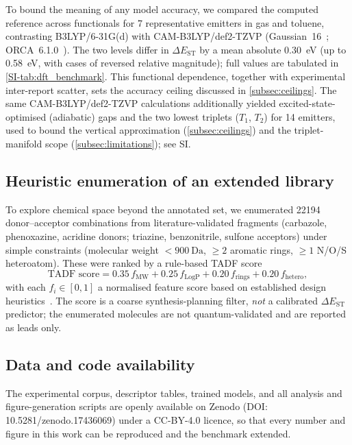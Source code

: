 To bound the meaning of any model accuracy, we compared the computed reference
across functionals for \num{7} representative emitters in gas and toluene,
contrasting B3LYP/6-31G(d) with CAM-B3LYP/def2-TZVP (Gaussian~16~\cite{Gaussian16};
ORCA~6.1.0~\cite{Neese2020}). The two levels differ in $\Delta E_\text{ST}$ by a
mean absolute \qty{0.30}{\electronvolt} (up to \qty{0.58}{\electronvolt}, with
cases of reversed relative magnitude); full values are tabulated in
\cref{SI-tab:dft_benchmark}. This functional dependence, together with
experimental inter-report scatter, sets the accuracy ceiling discussed in
\cref{subsec:ceilings}. The same CAM-B3LYP/def2-TZVP calculations additionally
yielded excited-state-optimised (adiabatic) gaps and the two lowest triplets
($T_1$, $T_2$) for \num{14} emitters, used to bound the vertical approximation
(\cref{subsec:ceilings}) and the triplet-manifold scope (\cref{subsec:limitations});
see SI.

\subsection{Heuristic enumeration of an extended library}\label{sec:library_expansion}

To explore chemical space beyond the annotated set, we enumerated \num{22194}
donor--acceptor combinations from literature-validated fragments (carbazole,
phenoxazine, acridine donors; triazine, benzonitrile, sulfone acceptors) under
simple constraints (molecular weight $<\qty{900}{\dalton}$, $\geq 2$ aromatic
rings, $\geq 1$ N/O/S heteroatom). These were ranked by a rule-based TADF score
\begin{equation}
  \text{TADF score} = 0.35\,f_\text{MW} + 0.25\,f_\text{LogP} + 0.20\,f_\text{rings} + 0.20\,f_\text{hetero},
  \label{eq:tadf_score}
\end{equation}
with each $f_i\in[0,1]$ a normalised feature score based on established design
heuristics~\cite{Liu2012,Uoyama2012,Wong2017}. The score is a coarse
synthesis-planning filter, \emph{not} a calibrated $\Delta E_\text{ST}$ predictor;
the enumerated molecules are not quantum-validated and are reported as leads only.

\subsection{Data and code availability}

The experimental corpus, descriptor tables, trained models, and all analysis and
figure-generation scripts are openly available on Zenodo
(DOI: 10.5281/zenodo.17436069) under a CC-BY-4.0 licence, so that every number and
figure in this work can be reproduced and the benchmark extended.
